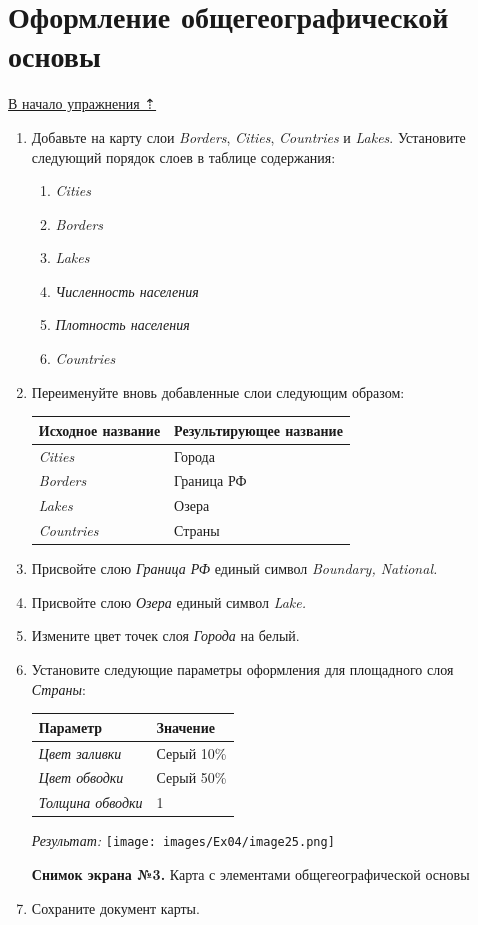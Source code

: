 \documentclass[12pt,]{book}
\providecommand{\tightlist}{%
  \setlength{\itemsep}{0pt}\setlength{\parskip}{0pt}}
\begin{document}
\hypertarget{map-design-economic-general}{%
\section{Оформление общегеографической основы}\label{map-design-economic-general}}

\protect\hyperlink{map-design-economic}{В начало упражнения ⇡}

\begin{enumerate}
\def\labelenumi{\arabic{enumi}.}
\item
  Добавьте на карту слои \emph{Borders}, \emph{Cities}, \emph{Countries} и \emph{Lakes}. Установите следующий порядок слоев в таблице содержания:

  \begin{enumerate}
  \def\labelenumii{\alph{enumii}.}
  \tightlist
  \item
    \emph{Cities}
  \item
    \emph{Borders}
  \item
    \emph{Lakes}
  \item
    \emph{Численность населения}
  \item
    \emph{Плотность населения}
  \item
    \emph{Countries}
  \end{enumerate}
\item
  Переименуйте вновь добавленные слои следующим образом:

  \begin{longtable}[]{@{}ll@{}}
  \toprule
  \textbf{Исходное название} & \textbf{Результирующее название}\tabularnewline
  \midrule
  \endhead
  \emph{Cities} & Города\tabularnewline
  \emph{Borders} & Граница РФ\tabularnewline
  \emph{Lakes} & Озера\tabularnewline
  \emph{Countries} & Страны\tabularnewline
  \bottomrule
  \end{longtable}
\item
  Присвойте слою \emph{Граница РФ} единый символ \emph{Boundary, National.}
\item
  Присвойте слою \emph{Озера} единый символ \emph{Lake.}
\item
  Измените цвет точек слоя \emph{Города} на белый.
\item
  Установите следующие параметры оформления для площадного слоя \emph{Страны}:

  \begin{longtable}[]{@{}ll@{}}
  \toprule
  \textbf{Параметр} & \textbf{Значение}\tabularnewline
  \midrule
  \endhead
  \emph{Цвет заливки} & Серый 10\%\tabularnewline
  \emph{Цвет обводки} & Серый 50\%\tabularnewline
  \emph{Толщина обводки} & 1\tabularnewline
  \bottomrule
  \end{longtable}

  \emph{Результат:}
  \texttt{[image: images/Ex04/image25.png]}

  \textbf{Снимок экрана №3.} Карта с элементами общегеографической основы
\item
  Сохраните документ карты.
\end{enumerate}
\end{document}
